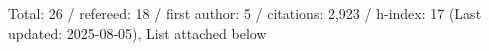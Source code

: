 Total: 26 / refereed: 18 / first author: 5 / citations: 2,923 / h-index: 17 (Last updated: 2025-08-05), List attached below